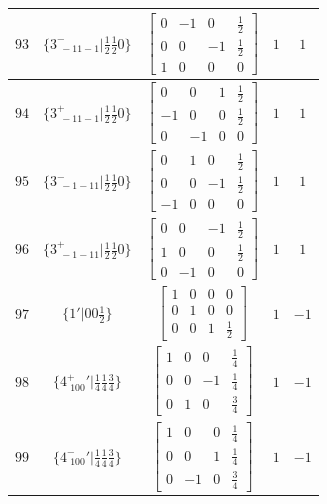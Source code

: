 \documentclass[fleqn,8pt]{jsarticle}
\begin{document}
\begin{longtable}{ccccc}
$ 93 $ & $ \{3^{-}_{\,\,-11-1}|\frac{1}{2} \frac{1}{2} 0\} $ & $ \begin{bmatrix} 0 & -1 & 0 & \frac{1}{2} \\ 0 & 0 & -1 & \frac{1}{2} \\ 1 & 0 & 0 & 0 \end{bmatrix} $ & $ 1 $ & $ 1 $ \\ \hline
$ 94 $ & $ \{3^{+}_{\,\,-11-1}|\frac{1}{2} \frac{1}{2} 0\} $ & $ \begin{bmatrix} 0 & 0 & 1 & \frac{1}{2} \\ -1 & 0 & 0 & \frac{1}{2} \\ 0 & -1 & 0 & 0 \end{bmatrix} $ & $ 1 $ & $ 1 $ \\ \hline
$ 95 $ & $ \{3^{-}_{\,\,-1-11}|\frac{1}{2} \frac{1}{2} 0\} $ & $ \begin{bmatrix} 0 & 1 & 0 & \frac{1}{2} \\ 0 & 0 & -1 & \frac{1}{2} \\ -1 & 0 & 0 & 0 \end{bmatrix} $ & $ 1 $ & $ 1 $ \\ \hline
$ 96 $ & $ \{3^{+}_{\,\,-1-11}|\frac{1}{2} \frac{1}{2} 0\} $ & $ \begin{bmatrix} 0 & 0 & -1 & \frac{1}{2} \\ 1 & 0 & 0 & \frac{1}{2} \\ 0 & -1 & 0 & 0 \end{bmatrix} $ & $ 1 $ & $ 1 $ \\ \hline
$ 97 $ & $ \{1{}'|0 0 \frac{1}{2}\} $ & $ \begin{bmatrix} 1 & 0 & 0 & 0 \\ 0 & 1 & 0 & 0 \\ 0 & 0 & 1 & \frac{1}{2} \end{bmatrix} $ & $ 1 $ & $ -1 $ \\ \hline
$ 98 $ & $ \{4^{+}_{\,\,100}{}'|\frac{1}{4} \frac{1}{4} \frac{3}{4}\} $ & $ \begin{bmatrix} 1 & 0 & 0 & \frac{1}{4} \\ 0 & 0 & -1 & \frac{1}{4} \\ 0 & 1 & 0 & \frac{3}{4} \end{bmatrix} $ & $ 1 $ & $ -1 $ \\ \hline
$ 99 $ & $ \{4^{-}_{\,\,100}{}'|\frac{1}{4} \frac{1}{4} \frac{3}{4}\} $ & $ \begin{bmatrix} 1 & 0 & 0 & \frac{1}{4} \\ 0 & 0 & 1 & \frac{1}{4} \\ 0 & -1 & 0 & \frac{3}{4} \end{bmatrix} $ & $ 1 $ & $ -1 $ \\ \hline

\end{longtable}
\end{document}
